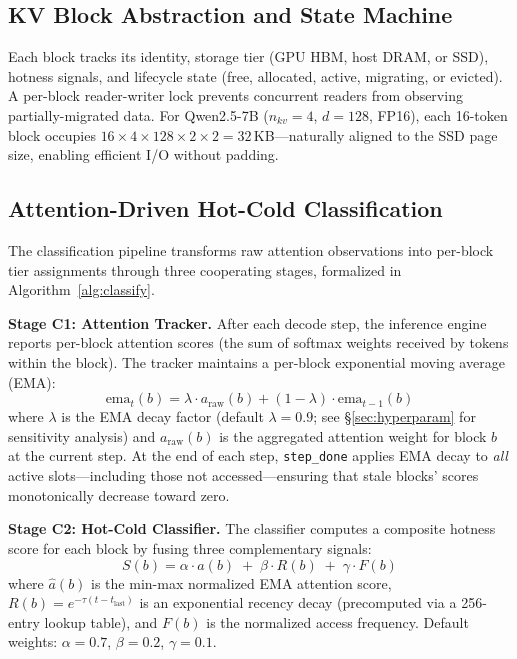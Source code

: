 \documentclass[conference]{IEEEtran}
\begin{document}
\subsection{KV Block Abstraction and State Machine}
\label{sec:block-abstraction}

Each block tracks its identity, storage tier (GPU HBM, host DRAM, or SSD), hotness signals, and lifecycle state (free, allocated, active, migrating, or evicted). A per-block reader-writer lock prevents concurrent readers from observing partially-migrated data. For Qwen2.5-7B ($n_{kv}{=}4$, $d{=}128$, FP16), each 16-token block occupies $16 \times 4 \times 128 \times 2 \times 2 = 32$\,KB---naturally aligned to the SSD page size, enabling efficient I/O without padding.

\subsection{Attention-Driven Hot-Cold Classification}
\label{sec:classification}

The classification pipeline transforms raw attention observations into per-block tier assignments through three cooperating stages, formalized in Algorithm~\ref{alg:classify}.

\textbf{Stage C1: Attention Tracker.} After each decode step, the inference engine reports per-block attention scores (the sum of softmax weights received by tokens within the block). The tracker maintains a per-block exponential moving average (EMA):
\begin{equation}
\text{ema}_{t}(b) = \lambda \cdot a_{\text{raw}}(b) + (1 - \lambda) \cdot \text{ema}_{t-1}(b)
\end{equation}
where $\lambda$ is the EMA decay factor (default $\lambda{=}0.9$; see \S\ref{sec:hyperparam} for sensitivity analysis) and $a_{\text{raw}}(b)$ is the aggregated attention weight for block $b$ at the current step. At the end of each step, \texttt{step\_done} applies EMA decay to \emph{all} active slots---including those not accessed---ensuring that stale blocks' scores monotonically decrease toward zero.

\textbf{Stage C2: Hot-Cold Classifier.} The classifier computes a composite hotness score for each block by fusing three complementary signals:
\begin{equation}
S(b) = \alpha \cdot \hat{a}(b) \;+\; \beta \cdot R(b) \;+\; \gamma \cdot F(b)
\label{eq:hotness}
\end{equation}
where $\hat{a}(b)$ is the min-max normalized EMA attention score, $R(b) = e^{-\tau (t - t_{\text{last}})}$ is an exponential recency decay (precomputed via a 256-entry lookup table), and $F(b)$ is the normalized access frequency. Default weights: $\alpha{=}0.7$, $\beta{=}0.2$, $\gamma{=}0.1$.
\end{document}
